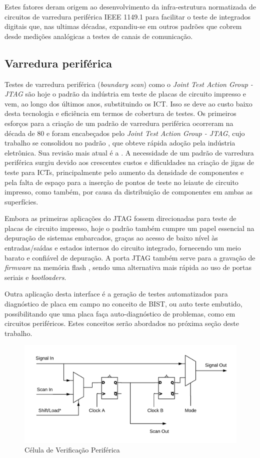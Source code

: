 Estes fatores deram origem ao desenvolvimento da infra-estrutura normatizada de circuitos de varredura periférica IEEE 1149.1 \citep{ieee11491old} para facilitar o teste de integrados digitais que, nas ultimas décadas, expandiu-se em outros padrões que cobrem desde medições analógicas a testes de canais de comunicação. 

\subsection{Varredura periférica}

Testes de varredura periférica (\textit{boundary scan}) como o \textit{Joint Test Action Group - JTAG} são hoje o padrão da indústria em teste de placas de circuito impresso e vem, ao longo dos últimos anos, substituindo os ICT. Isso se deve ao custo baixo desta tecnologia e eficiência em termos de cobertura de testes. Os primeiros esforços para a criação de um padrão de varredura periférica ocorreram na década de 80 e foram encabeçados pelo \textit{Joint Test Action Group - JTAG}, cujo trabalho se consolidou no padrão \citet{ieee11491old}, que obteve rápida adoção pela indústria eletrônica. Sua revisão mais atual é a \citet{ieee11491yr2013}.
A necessidade de um padrão de varredura periférica surgiu devido aos crescentes custos e dificuldades na criação de jigas de teste para ICTs, principalmente pelo aumento da densidade de componentes e pela falta de espaço para a inserção de pontos de teste no leiaute de circuito impresso, como também, por causa da distribuição de componentes em ambas as superfícies. 

Embora as primeiras aplicações do JTAG fossem direcionadas para teste de placas de circuito impresso, hoje o padrão também cumpre um papel essencial na depuração de sistemas embarcados, graças ao acesso de baixo nível às entradas/saídas e estados internos do circuito integrado, fornecendo um meio barato e confiável de depuração.
A porta JTAG também serve para a gravação de \textit{firmware} na memória flash \citep{ieee1532}, sendo uma alternativa mais rápida ao uso de portas seriais e \textit{bootloaders}. 

Outra aplicação desta interface é a geração de testes automatizados para diagnóstico de placa em campo no conceito de BIST, ou auto teste embutido, possibilitando que uma placa faça auto-diagnóstico de problemas, como em circuitos periféricos. Estes conceitos serão abordados no próxima seção deste trabalho.

\begin{figure}
    \centering
        \includegraphics[width=0.8\linewidth]{fig/bscell}
            \caption{Célula de Verificação Periférica}
            \label{fig:bscell}
\end{figure}


